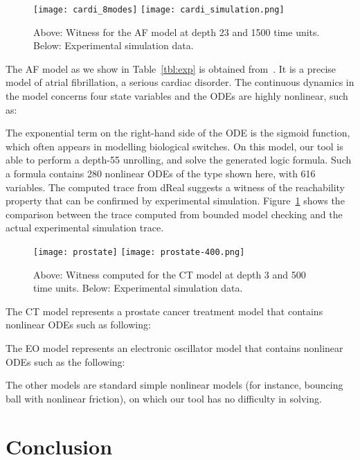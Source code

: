 \documentclass[12pt]{article}
\begin{document}
\begin{figure}[h!]
\begin{center}
\texttt{[image: cardi\_8modes]}
\texttt{[image: cardi\_simulation.png]}
\end{center}
\caption{Above: Witness for the AF model at depth 23 and 1500 time units. Below: Experimental simulation data.}\label{cardi}
\end{figure}
The AF model as we show in Table~\ref{tbl:exp} is obtained from~\cite{DBLP:conf/cav/GrosuBFGGSB11}. It is a precise model of atrial fibrillation, a serious cardiac disorder. The continuous dynamics in the model concerns four state variables and the ODEs are highly nonlinear, such as:{\small

}
The exponential term on the right-hand side of the ODE is the sigmoid function, which  often appears in modelling biological switches. On this model, our tool is able to perform a depth-55 unrolling, and solve the generated logic formula. Such a formula contains 280 nonlinear ODEs of the type shown here, with 616 variables. The computed trace from {\sf dReal} suggests a witness of the reachability property that can be confirmed by experimental simulation. Figure~\ref{cardi} shows the comparison between the trace computed from bounded model checking and the actual experimental simulation trace.
\begin{figure}[h!]
\begin{center}
\texttt{[image: prostate]}
\texttt{[image: prostate-400.png]}
\end{center}
\caption{Above: Witness computed for the CT model at depth 3 and 500 time units. Below: Experimental simulation data.}\label{ct}
\end{figure}

The CT model represents a prostate cancer treatment model that contains nonlinear ODEs such as following:
{\small

}The EO model represents an electronic oscillator model that contains nonlinear ODEs such as the following:
{\small

}

The other models are standard simple nonlinear models (for instance, bouncing ball with nonlinear friction), on which our tool has no difficulty in solving.  

\section{Conclusion}\label{conclude}
\end{document}
